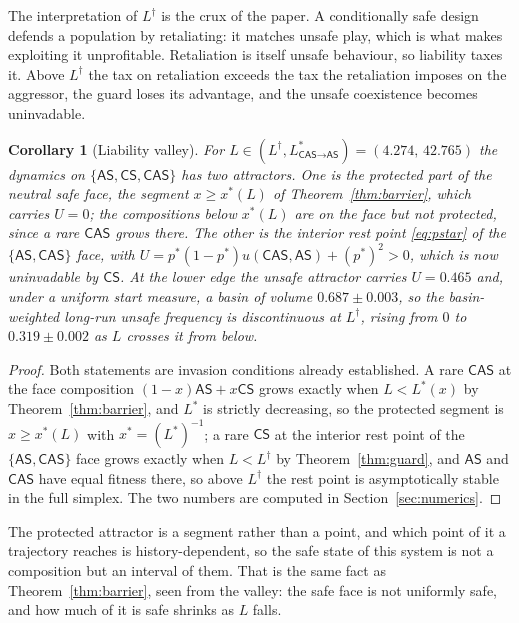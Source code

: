 \documentclass[pdflatex]{sn-jnl}
\theoremstyle{thmstyleone}
\newtheorem{corollary}[theorem]{Corollary}
\theoremstyle{thmstylethree}
\theoremstyle{thmstyletwo}
\newcommand{\AS}{\textsf{AS}}
\newcommand{\CS}{\textsf{CS}}
\newcommand{\CAS}{\textsf{CAS}}
\begin{document}
The interpretation of $L^{\dagger}$ is the crux of the paper. A conditionally
safe design defends a population by retaliating: it matches unsafe play, which
is what makes exploiting it unprofitable. Retaliation is itself unsafe
behaviour, so liability taxes it. Above $L^{\dagger}$ the tax on retaliation
exceeds the tax the retaliation imposes on the aggressor, the guard loses its
advantage, and the unsafe coexistence becomes uninvadable.

\begin{corollary}[Liability valley]\label{cor:valley}
For $L\in(L^{\dagger},L^{*}_{\CAS\to\AS})=(4.274,\,42.765)$ the dynamics on
$\{\AS,\CS,\CAS\}$ has two attractors. One is the protected part of the
neutral safe face, the segment $x\ge x^{*}(L)$ of Theorem~\ref{thm:barrier},
which carries $U=0$; the compositions below $x^{*}(L)$ are on the face but
not protected, since a rare $\CAS$ grows there. The other is the interior rest
point \eqref{eq:pstar} of the $\{\AS,\CAS\}$ face, with
$U=p^{*}(1-p^{*})u(\CAS,\AS)+(p^{*})^{2}>0$, which is now uninvadable by
$\CS$. At the lower edge the unsafe attractor carries $U=0.465$ and, under a
uniform start measure, a basin of volume $0.687\pm0.003$, so the
basin-weighted long-run unsafe frequency is discontinuous at $L^{\dagger}$,
rising from $0$ to $0.319\pm0.002$ as $L$ crosses it from below.
\end{corollary}

\begin{proof}
Both statements are invasion conditions already established. A rare $\CAS$ at
the face composition $(1-x)\AS+x\CS$ grows exactly when $L<L^{*}(x)$ by
Theorem~\ref{thm:barrier}, and $L^{*}$ is strictly decreasing, so the
protected segment is $x\ge x^{*}(L)$ with $x^{*}=(L^{*})^{-1}$; a rare $\CS$
at the interior rest point of the $\{\AS,\CAS\}$ face grows exactly when
$L<L^{\dagger}$ by Theorem~\ref{thm:guard}, and $\AS$ and $\CAS$ have equal
fitness there, so above $L^{\dagger}$ the rest point is asymptotically stable
in the full simplex. The two numbers are computed in
Section~\ref{sec:numerics}.
\end{proof}

The protected attractor is a segment rather than a point, and which point of
it a trajectory reaches is history-dependent, so the safe state of this system
is not a composition but an interval of them. That is the same fact as
Theorem~\ref{thm:barrier}, seen from the valley: the safe face is not
uniformly safe, and how much of it is safe shrinks as $L$ falls.
\end{document}
